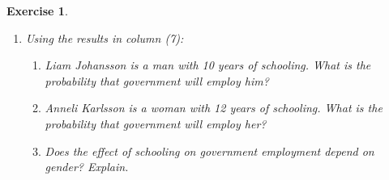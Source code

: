\documentclass{article}
\newtheorem{exercise}[theorem]{Exercise}
\begin{document}
\begin{exercise}
\begin{enumerate}[label=\alph*)]
    \item Using the results in column (7):
        \begin{enumerate}[label=\roman* --]
    \item Liam Johansson is a man with 10 years of schooling. What is the probability that government will employ him?
    \item Anneli Karlsson is a woman with 12 years of schooling. What is the probability that government will employ her?
    \item Does the effect of schooling on government employment depend on gender? Explain.
        \end{enumerate}
        \end{enumerate}
\end{exercise}
\end{document}
